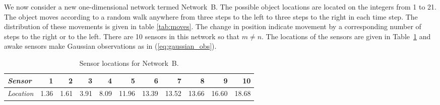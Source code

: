 \documentclass[journal,draftcls,onecolumn,11pt]{IEEEtran}
\begin{document}
We now consider a new one-dimensional network termed Network~B.  The possible object locations are located on the integers from 1 to 21.  The object moves according to a random walk anywhere from three steps to the left to three steps to the right in each time step. The distribution of these movements is given in table \ref{tab:moves}. The change in position indicate movement by a corresponding number of steps to the right or to the left. There are 10 sensors in this network so that $m \neq n$. The locations of the sensors are given in Table~\ref{tab:sensloc} and awake sensors make Gaussian observations as in (\ref{eq:gaussian_obs}).
\begin{table}
   \begin{center}
      \caption{Sensor locations for Network~B. \label{tab:sensloc}}
      \begin{tabular}{|l|r|r|r|r|r|r|r|r|r|r|}
         \hline
         {\em Sensor} & 1 & 2 & 3 & 4 & 5 & 6 & 7 & 8 & 9 & 10 \\ \hline
         {\em Location} & 1.36 & 1.61 & 3.91 & 8.09 & 11.96 & 13.39 & 13.52 & 13.66 & 16.60 & 18.68 \\ \hline
      \end{tabular}
   \end{center}
\end{table}
\end{document}
